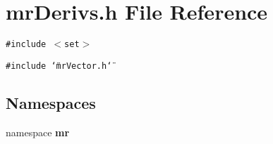 \section{mr\-Derivs.h File Reference}
\label{mrDerivs_8h}
{\tt \#include $<$set$>$}\par
{\tt \#include \char`\"{}mr\-Vector.h\char`\"{}}\par
\subsection*{Namespaces}
\begin{CompactItemize}
\item 
namespace {\bf mr}
\end{CompactItemize}
